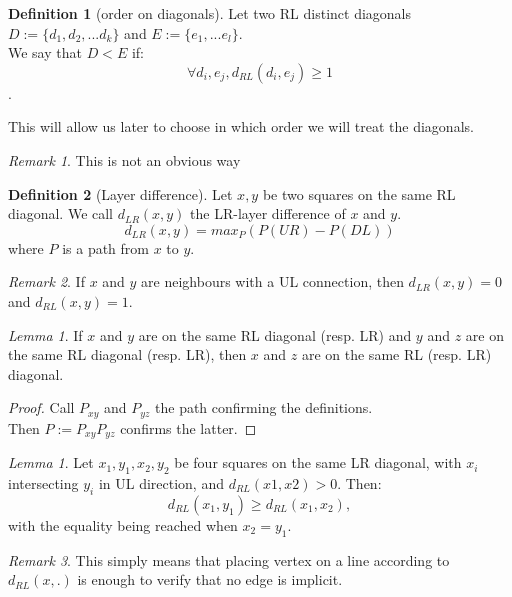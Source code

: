 \documentclass[12pt]{article}
\theoremstyle{definition}
\newtheorem{definition}{Definition}[section]
\theoremstyle{remark}
\newtheorem*{remark}{Remark}
\newtheorem{lemma}[theorem]{Lemma}
\begin{document}
\begin{definition}[order on diagonals]
    Let two RL distinct diagonals $D := \{d_1, d_2, ... d_k \} $ and $E:= \{e_1, ... e_l\}$.   \\
    We say that $D<E$ if:  
    $$\forall d_i, e_j, d_{RL}(d_i, e_j) \ge 1$$.
\end{definition}
This will allow us later to choose in which order we will treat the diagonals.

\begin{remark}
    This is not an obvious way 
\end{remark}

\begin{definition}[Layer difference]
    Let $x,y$ be two squares on the same RL diagonal. We call $d_{LR}(x,y)$ the LR-layer difference of $x$ and $y$. 
    $$ d_{LR}(x,y) = max_P(P(UR)-P(DL))$$ 
    where $P$ is a path from $x$ to $y$.     
\end{definition}

\begin{remark}
    If $x$ and $y$ are neighbours with a UL connection, then $d_{LR}(x,y) = 0$ and $d_{RL}(x,y) = 1$.
\end{remark}

\begin{lemma}
    If $x$ and $y$ are on the same RL diagonal (resp. LR) and $y$ and $z$ are on the same RL diagonal (resp. LR), then $x$ and $z$ are on the same RL (resp. LR) diagonal.
\end{lemma}

\begin{proof}
    Call $P_{xy}$ and $P_{yz}$ the path confirming the definitions. \\
    Then $P := P_{xy}P_{yz}$ confirms the latter. 
\end{proof}


\begin{lemma}
    Let $x_1, y_1, x_2, y_2$ be four squares on the same LR diagonal, with $x_i$ intersecting $y_i$ in UL direction, and $d_{RL}(x1, x2) >0$. Then: $$d_{RL}(x_1, y_1) \ge d_{RL}(x_1, x_2),$$
    with the equality being reached when $x_2 = y_1$.
\end{lemma}

\begin{remark}
    This simply means that placing vertex on a line according to $d_{RL}(x, .)$ is enough to verify that no edge is implicit.
\end{remark}
\end{document}
